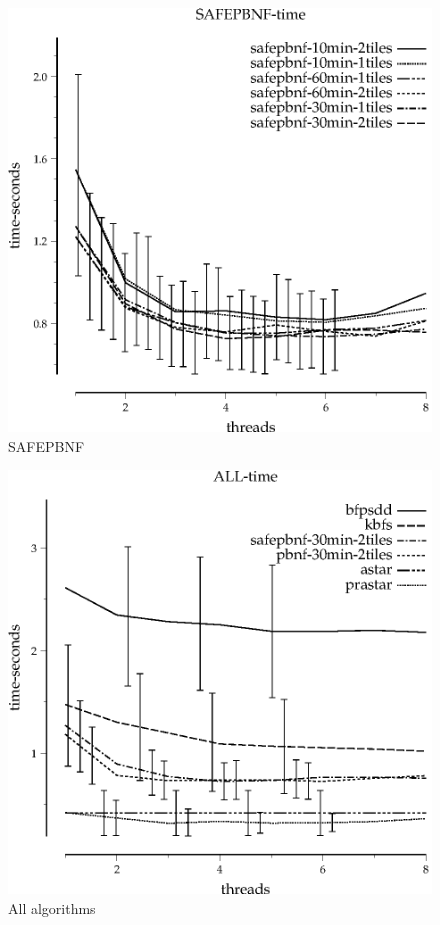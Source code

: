 \documentclass{article}
\begin{document}
\begin{figure}
\begin{center}
\includegraphics{SAFEPBNF-time}
\end{center}
\caption{SAFEPBNF}
\end{figure}

\begin{figure}
\begin{center}
\includegraphics{ALL-time}
\end{center}
\caption{All algorithms}
\end{figure}
\end{document}
